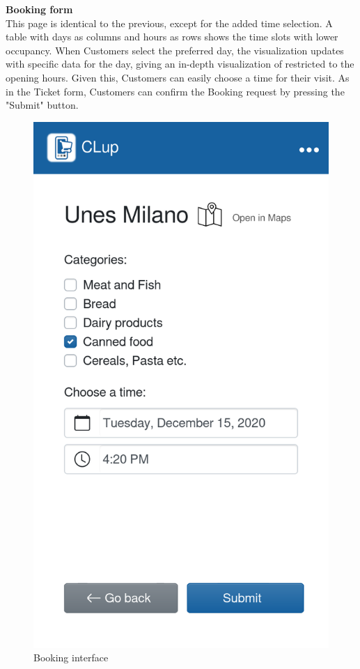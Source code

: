 \pagebreak
\textbf{Booking form}\\
\label{page:booking_form}
This page is identical to the previous, except for the added time selection. A table with days as columns and hours as rows shows the time slots with lower occupancy. When Customers select the preferred day, the visualization updates with specific data for the day, giving an in-depth visualization of restricted to the opening hours. Given this, Customers can easily choose a time for their visit. As in the Ticket form, Customers can confirm the Booking request by pressing the "Submit" button.
\begin{figure}[H]
    \centering
    \includegraphics[scale=0.25]{Images/booking-mockup.png}
    \caption{Booking interface}
\end{figure}

